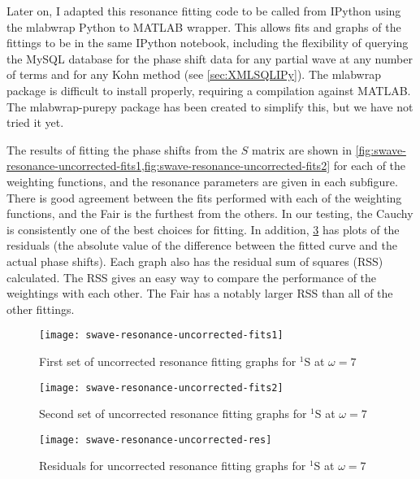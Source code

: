 \documentclass[Dissertation.tex]{subfiles}
\begin{document}
Later on, I adapted this resonance fitting code to be called from IPython 
\cite{ipython} using the mlabwrap \cite{mlabwrap} Python to MATLAB wrapper. 
This allows fits and graphs of the fittings to be in the same IPython 
notebook, including the flexibility of querying the MySQL database for the 
phase shift data for any partial wave at any number of terms and for
any Kohn method
(see \cref{sec:XMLSQLIPy}). The mlabwrap package is difficult to install properly, 
requiring a compilation against MATLAB. The mlabwrap-purepy package
\cite{mlabwrappurepy} has been created to simplify this, but we have not tried it 
yet.

The results of fitting the phase shifts from the $S$ matrix are shown in
\cref{fig:swave-resonance-uncorrected-fits1,fig:swave-resonance-uncorrected-fits2} 
for each of the weighting functions, and the resonance parameters are given 
in each subfigure. There is good agreement between the fits performed with 
each of the weighting functions, and the Fair is the furthest from the 
others. In our testing, the Cauchy is consistently one of the best choices 
for fitting. In addition, \cref{fig:swave-resonance-uncorrected-res} has 
plots of the residuals (the absolute value of the difference between the 
fitted curve and the actual phase shifts). Each graph also has the residual 
sum of squares (RSS) calculated. The RSS gives an easy way to compare the 
performance of the weightings with each other. The Fair has a notably larger 
RSS than all of the other fittings.

\begin{figure}[H]
	\centering
	\texttt{[image: swave-resonance-uncorrected-fits1]}
	\caption{First set of uncorrected resonance fitting graphs for $^1$S at $\omega = 7$}
	\label{fig:swave-resonance-uncorrected-fits1}
\end{figure}

\begin{figure}[H]
	\centering
	\texttt{[image: swave-resonance-uncorrected-fits2]}
	\caption{Second set of uncorrected resonance fitting graphs for $^1$S at $\omega = 7$}
	\label{fig:swave-resonance-uncorrected-fits2}
\end{figure}

\begin{figure}[H]
	\centering
	\texttt{[image: swave-resonance-uncorrected-res]}
	\caption{Residuals for uncorrected resonance fitting graphs for $^1$S at $\omega = 7$}
	\label{fig:swave-resonance-uncorrected-res}
\end{figure}
\end{document}
